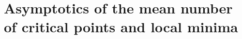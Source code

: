 \documentclass[twoside]{article}
\begin{document}

\section{Asymptotics of the mean number of critical points and local minima}
\end{document}
